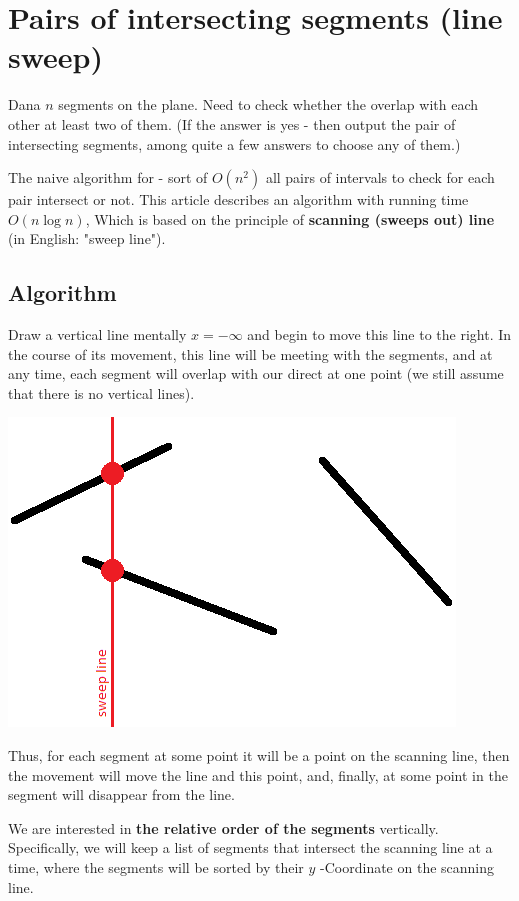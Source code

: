 \section{ Pairs of intersecting segments (line sweep) }
Dana $n$ segments on the plane. Need to check whether the overlap with each other at least two of them. (If the answer is yes - then output the pair of intersecting segments, among quite a few answers to choose any of them.)

The naive algorithm for - sort of $O (n ^ 2)$ all pairs of intervals to check for each pair intersect or not. This article describes an algorithm with running time $O (n \log n)$, Which is based on the principle of \textbf{scanning (sweeps out) line} (in English: "sweep line").

\subsection{ Algorithm }

Draw a vertical line mentally $x = - \infty$ and begin to move this line to the right. In the course of its movement, this line will be meeting with the segments, and at any time, each segment will overlap with our direct at one point (we still assume that there is no vertical lines).

\includegraphics[scale=0.5]{17.png}

Thus, for each segment at some point it will be a point on the scanning line, then the movement will move the line and this point, and, finally, at some point in the segment will disappear from the line.

We are interested in \textbf{the relative order of the segments} vertically. Specifically, we will keep a list of segments that intersect the scanning line at a time, where the segments will be sorted by their $y$ -Coordinate on the scanning line.

